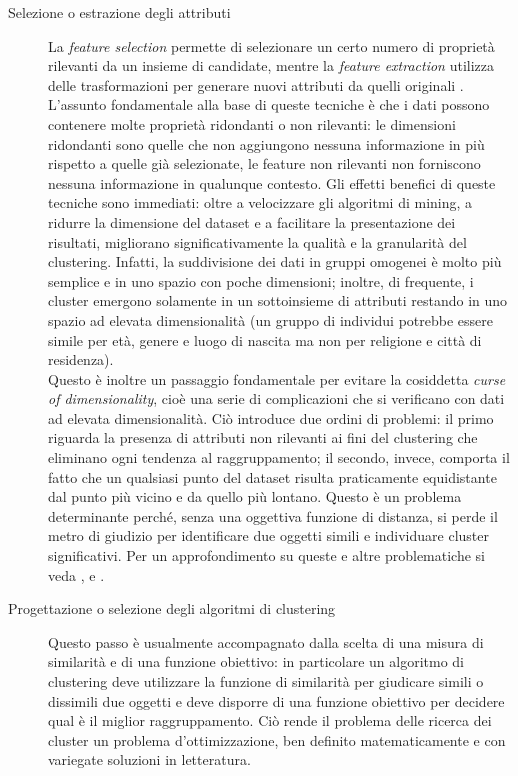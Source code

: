 \begin{description}

\item[Selezione o estrazione degli attributi] La \textit{feature selection} permette di selezionare un certo numero di propriet\`a rilevanti da un insieme di candidate, mentre la \textit{feature extraction} utilizza delle trasformazioni per generare nuovi attributi da quelli originali \cite{PatternAnalysis}. L'assunto fondamentale alla base di queste tecniche \`e che i dati possono contenere molte propriet\`a ridondanti o non rilevanti: le dimensioni ridondanti sono quelle che non aggiungono nessuna informazione in pi\`u rispetto a quelle gi\`a selezionate, le feature non rilevanti non forniscono nessuna informazione in qualunque contesto. Gli effetti benefici di queste tecniche sono immediati: oltre a velocizzare gli algoritmi di mining, a ridurre la dimensione del dataset e a facilitare la presentazione dei risultati, migliorano significativamente la qualit\`a e la granularit\`a del clustering. Infatti, la suddivisione dei dati in gruppi omogenei \`e molto pi\`u semplice e  in uno spazio con poche dimensioni; inoltre, di frequente, i cluster emergono solamente in un sottoinsieme di attributi restando  in uno spazio ad elevata dimensionalit\`a (un gruppo di individui potrebbe essere simile per et\`a, genere e luogo di nascita ma non per religione e citt\`a di residenza).\\
Questo \`e inoltre un passaggio fondamentale per evitare la cosiddetta \textit{curse of dimensionality}, cio\`e una serie di complicazioni che si verificano con dati ad elevata dimensionalit\`a. Ci\`o introduce due ordini di problemi: il primo riguarda la presenza di attributi non rilevanti ai fini del clustering che eliminano ogni tendenza al raggruppamento; il secondo, invece, comporta il fatto che un qualsiasi punto del dataset risulta praticamente equidistante dal punto pi\`u vicino e da quello pi\`u lontano. Questo \`e un problema determinante perch\'e, senza una oggettiva funzione di distanza, si perde il metro di giudizio per identificare due oggetti simili e individuare cluster significativi. Per un approfondimento su queste e altre problematiche si veda \cite{Kriegel09}, \cite{Beyer99} e \cite{Aggarwal01}.
\item[Progettazione o selezione degli algoritmi di clustering] Questo passo \`e usualmente accompagnato dalla scelta di una misura di similarit\`a e di una funzione obiettivo: in particolare un algoritmo di clustering deve utilizzare la funzione di similarit\`a per giudicare simili o dissimili due oggetti e deve disporre di una funzione obiettivo per decidere qual \`e il miglior raggruppamento. Ci\`o rende il problema delle ricerca dei cluster un problema d'ottimizzazione, ben definito matematicamente e con variegate soluzioni in letteratura.

\end{description}
